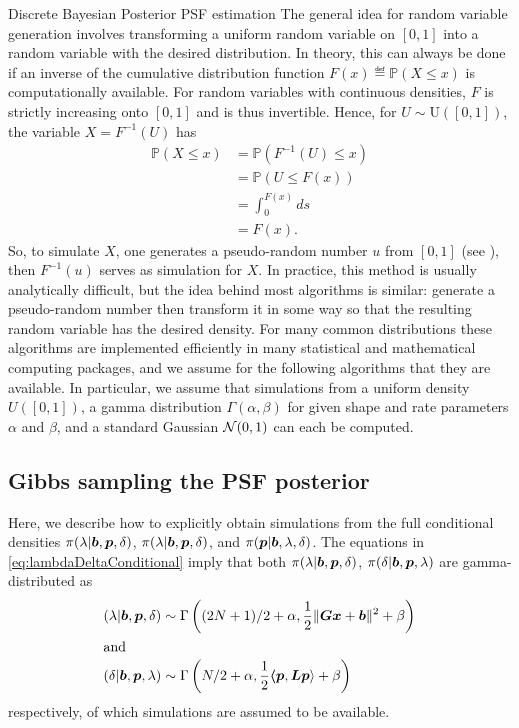 \begin{chapter}{Discrete Bayesian Posterior PSF estimation}
The general idea for random variable generation involves transforming a uniform random variable on $[0,1]$ into a random variable with the desired distribution.
In theory, this can always be done if an inverse of the cumulative distribution function $F(x) \eqdef \mathbb P(X \le x)$ is computationally available.
For random variables with continuous densities, $F$ is strictly increasing onto $[0,1]$ and is thus invertible.  
Hence, for $U\sim \mathrm{U([0,1])}$, the variable $X = F^{-1}(U)$ has 
\begin{align}
  \mathbb P( X \le x) 
  &= \mathbb P( F^{-1}(U)\le  x ) \nonumber \\
  &= \mathbb P( U \le F(x) )\nonumber\\
  &= \int_0^{F(x)}ds\nonumber\\
  &= F(x).
\end{align}
So, to simulate $X$, one generates a pseudo-random number $u$ from $[0,1]$ (see \citep{knuthart1981}), then $F^{-1}(u)$ serves as simulation for $X$.
In practice, this method is usually analytically difficult, but the idea behind most algorithms is similar: generate a pseudo-random number then transform it in some way so that the resulting random variable has the desired density.
For many common distributions these algorithms are implemented efficiently in many statistical and mathematical computing packages, and we assume for the following algorithms that they are available.
In particular, we assume that simulations from a uniform density $U([0,1])$, a gamma distribution $\Gamma(\alpha,\beta)$ for given shape and rate parameters $\alpha$ and $\beta$, and a standard Gaussian $\mathcal{N}(0,1)$ can each be computed.

\subsection{Gibbs sampling the PSF posterior} \label{subsec:gibbs}

Here, we describe how to explicitly obtain simulations from the full conditional densities $\pi(\lambda|\mbox{\boldmath$b$},\mbox{\boldmath$p$},\delta)$, $\pi(\lambda|\mbox{\boldmath$b$},\mbox{\boldmath$p$},\delta)$, and $\pi(\mbox{\boldmath$p$}|\mbox{\boldmath$b$},\lambda,\delta)$.
The equations in \eqref{eq:lambdaDeltaConditional} imply that both $\pi(\lambda|\mbox{\boldmath$b$},\mbox{\boldmath$p$},\delta)$, $\pi(\delta|\mbox{\boldmath$b$},\mbox{\boldmath$p$},\lambda)$ are gamma-distributed as
\begin{align}
  (\lambda|\mbox{\boldmath$b$},\mbox{\boldmath$p$},\delta) &\sim \Gamma\left((2N+1)/2+\alpha,\frac{1}{2}\|\mbox{\boldmath$Gx$} + \mbox{\boldmath$b$}\|^2 + \beta\right)\\
  \intertext{and}
  (\delta|\mbox{\boldmath$b$},\mbox{\boldmath$p$},\lambda) &\sim \Gamma\left(N/2+\alpha,\frac{1}{2}\mbox{\boldmath$\langle$} \mbox{\boldmath$p$},\mbox{\boldmath$L$}\mbox{\boldmath$p$} \rangle+ \beta\right)
\end{align}
respectively, of which simulations are assumed to be available.


\end{chapter}

